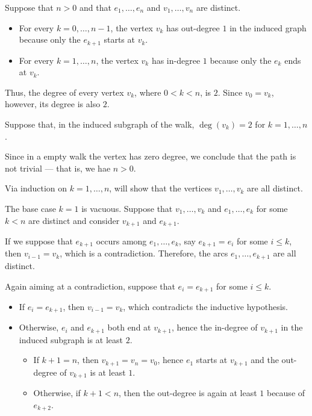 \begin{defproof}
   Suppose that \( n > 0 \) and that \( e_1, \ldots, e_n \) and \( v_1, \ldots, v_n \) are distinct.

  \begin{itemize}
    \item For every \( k = 0, \ldots, n - 1 \), the vertex \( v_k \) has out-degree \( 1 \) in the induced graph because only the \( e_{k+1} \) starts at \( v_k \).

    \item For every \( k = 1, \ldots, n \), the vertex \( v_k \) has in-degree \( 1 \) because only the \( e_k \) ends at \( v_k \).
  \end{itemize}

  Thus, the degree of every vertex \( v_k \), where \( 0 < k < n \), is \( 2 \). Since \( v_0 = v_k \), however, its degree is also \( 2 \).

   Suppose that, in the induced subgraph of the walk, \( \deg(v_k) = 2 \) for \( k = 1, \ldots, n \).

  Since in a empty walk the vertex has zero degree, we conclude that the path is not trivial --- that is, we hae \( n > 0 \).

   Via induction on \( k = 1, \ldots, n \), will show that the vertices \( v_1, \ldots, v_k \) are all distinct.

  The base case \( k = 1 \) is vacuous. Suppose that \( v_1, \ldots, v_k \) and \( e_1, \ldots, e_k \) for some \( k < n \) are distinct and consider \( v_{k+1} \) and \( e_{k+1} \).

  If we suppose that \( e_{k+1} \) occurs among \( e_1, \ldots, e_k \), say \( e_{k+1} = e_i \) for some \( i \leq k \), then \( v_{i - 1} = v_k \), which is a contradiction. Therefore, the arcs \( e_1, \ldots, e_{k+1} \) are all distinct.

  Again aiming at a contradiction, suppose that \( e_i = e_{k+1} \) for some \( i \leq k \).
  \begin{itemize}
    \item If \( e_i = e_{k+1} \), then \( v_{i-1} = v_k \), which contradicts the inductive hypothesis.
    \item Otherwise, \( e_i \) and \( e_{k+1} \) both end at \( v_{k+1} \), hence the in-degree of \( v_{k+1} \) in the induced subgraph is at least \( 2 \).
    \begin{itemize}
      \item If \( k + 1 = n \), then \( v_{k+1} = v_n = v_0 \), hence \( e_1 \) starts at \( v_{k+1} \) and the out-degree of \( v_{k+1} \) is at least \( 1 \).
      \item Otherwise, if \( k + 1 < n \), then the out-degree is again at least \( 1 \) because of \( e_{k+2} \).
    \end{itemize}


\end{itemize}
\end{defproof}
